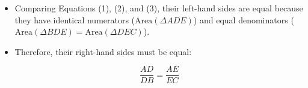 \begin{enumerate}[label=\thesubsection.\arabic*, ref=\thesubsection.\theenumi]
	
	\begin{itemize}
		\item Comparing Equations (1), (2), and (3), their left-hand sides are equal because they have identical numerators ($\text{Area}(\Delta ADE)$) and equal denominators ($\text{Area}(\Delta BDE) = \text{Area}(\Delta DEC)$).
		\item Therefore, their right-hand sides must be equal:
		
		$$\frac{AD}{DB} = \frac{AE}{EC}$$
		
	\end{itemize}
	
	
	
	
	
	
	\noindent
	
\end{enumerate}

